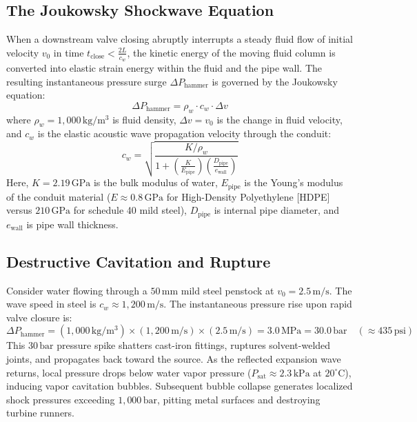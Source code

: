 \subsection{The Joukowsky Shockwave Equation}
When a downstream valve closing abruptly interrupts a steady fluid flow of initial velocity $v_0$ in time $t_{\mathrm{close}} < \frac{2 L}{c_w}$, the kinetic energy of the moving fluid column is converted into elastic strain energy within the fluid and the pipe wall. The resulting instantaneous pressure surge $\Delta P_{\mathrm{hammer}}$ is governed by the Joukowsky equation:
\begin{equation}
\Delta P_{\mathrm{hammer}} = \rho_w \cdot c_w \cdot \Delta v
\label{eq:joukowsky_equation}
\end{equation}
where $\rho_w = 1,000\,\mathrm{kg/m^3}$ is fluid density, $\Delta v = v_0$ is the change in fluid velocity, and $c_w$ is the elastic acoustic wave propagation velocity through the conduit:
\begin{equation}
c_w = \sqrt{ \frac{K / \rho_w}{1 + \left(\frac{K}{E_{\mathrm{pipe}}}\right)\left(\frac{D_{\mathrm{pipe}}}{e_{\mathrm{wall}}}\right)} }
\label{eq:acoustic_wave_speed}
\end{equation}
Here, $K = 2.19\,\mathrm{GPa}$ is the bulk modulus of water, $E_{\mathrm{pipe}}$ is the Young's modulus of the conduit material ($E \approx 0.8\,\mathrm{GPa}$ for High-Density Polyethylene [HDPE] versus $210\,\mathrm{GPa}$ for schedule 40 mild steel), $D_{\mathrm{pipe}}$ is internal pipe diameter, and $e_{\mathrm{wall}}$ is pipe wall thickness.

\subsection{Destructive Cavitation and Rupture}
Consider water flowing through a $50\,\mathrm{mm}$ mild steel penstock at $v_0 = 2.5\,\mathrm{m/s}$. The wave speed in steel is $c_w \approx 1,200\,\mathrm{m/s}$. The instantaneous pressure rise upon rapid valve closure is:
\begin{equation}
\Delta P_{\mathrm{hammer}} = (1,000\,\mathrm{kg/m^3}) \times (1,200\,\mathrm{m/s}) \times (2.5\,\mathrm{m/s}) = 3.0\,\mathrm{MPa} = 30.0\,\mathrm{bar} \quad (\approx 435\,\mathrm{psi})
\label{eq:water_hammer_example}
\end{equation}
This $30\,\mathrm{bar}$ pressure spike shatters cast-iron fittings, ruptures solvent-welded joints, and propagates back toward the source. As the reflected expansion wave returns, local pressure drops below water vapor pressure ($P_{\mathrm{sat}} \approx 2.3\,\mathrm{kPa}$ at $20^\circ\mathrm{C}$), inducing vapor cavitation bubbles. Subsequent bubble collapse generates localized shock pressures exceeding $1,000\,\mathrm{bar}$, pitting metal surfaces and destroying turbine runners.

